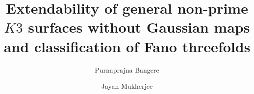 \documentclass[11pt,twoside]{amsart}
\theoremstyle{plain}
\numberwithin{equation}{section}
\theoremstyle{definition}
\begin{document}
\title[Extendability of general non-prime $K3$ surfaces without Gaussian maps ]{Extendability of general non-prime $K3$ surfaces without Gaussian maps and classification of Fano threefolds}


\author[P. Bangere]{Purnaprajna Bangere}
\address{Department of Mathematics, University of Kansas, Lawrence, USA}


\author[J. Mukherjee]{Jayan Mukherjee}
\address{Department of Mathematics, Oklahoma State University, Stillwater, USA}



\end{document}
